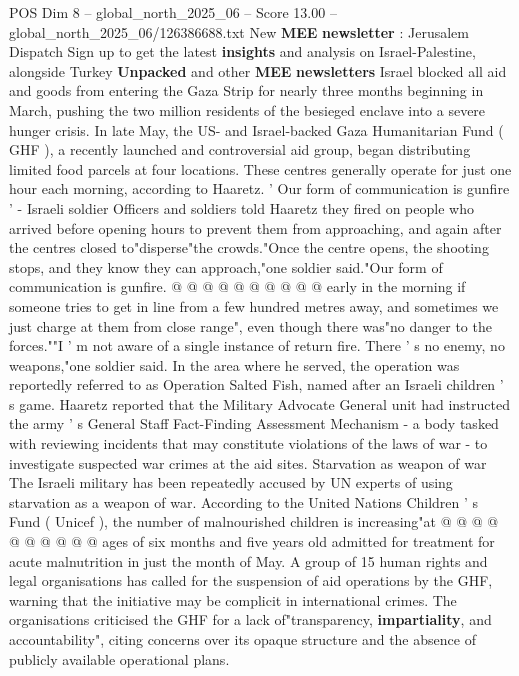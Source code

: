\begin{textsample}{POS Dim 8 – global\_north\_2025\_06 – Score 13.00 – global\_north\_2025\_06/126386688.txt}  \label{ex:f8_pos_042}
New \textbf{MEE} \textbf{newsletter} : Jerusalem Dispatch Sign up to get the latest \textbf{insights} and analysis on Israel-Palestine, alongside Turkey \textbf{Unpacked} and other \textbf{MEE} \textbf{newsletters} Israel blocked all aid and goods from entering the Gaza Strip for nearly three months beginning in March, pushing the two million residents of the besieged enclave into a severe hunger crisis.
In late May, the US- and Israel-backed Gaza Humanitarian Fund ( GHF ), a recently launched and controversial aid group, began distributing limited food parcels at four locations.
These centres generally operate for just one hour each morning, according to Haaretz. ' Our form of communication is gunfire ' - Israeli soldier Officers and soldiers told Haaretz they fired on people who arrived before opening hours to prevent them from approaching, and again after the centres closed to"disperse"the crowds."Once the centre opens, the shooting stops, and they know they can approach,"one soldier said."Our form of communication is gunfire. @ @ @ @ @ @ @ @ @ @ early in the morning if someone tries to get in line from a few hundred metres away, and sometimes we just charge at them from close range", even though there was"no danger to the forces.""I ' m not aware of a single instance of return fire.
There ' s no enemy, no weapons,"one soldier said.
In the area where he served, the operation was reportedly referred to as Operation Salted Fish, named after an Israeli children ' s game.
Haaretz reported that the Military Advocate General unit had instructed the army ' s General Staff Fact-Finding Assessment Mechanism - a body tasked with reviewing incidents that may constitute violations of the laws of war - to investigate suspected war crimes at the aid sites.
Starvation as weapon of war The Israeli military has been repeatedly accused by UN experts of using starvation as a weapon of war.
According to the United Nations Children ' s Fund ( Unicef ), the number of malnourished children is increasing"at @ @ @ @ @ @ @ @ @ @ ages of six months and five years old admitted for treatment for acute malnutrition in just the month of May.
A group of 15 human rights and legal organisations has called for the suspension of aid operations by the GHF, warning that the initiative may be complicit in international crimes.
The organisations criticised the GHF for a lack of"transparency, \textbf{impartiality}, and accountability", citing concerns over its opaque structure and the absence of publicly available operational plans.

\end{textsample}
